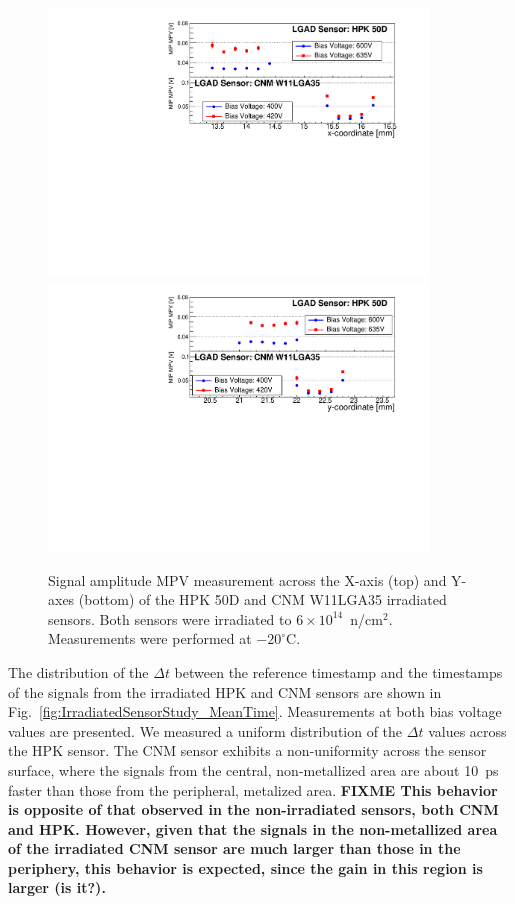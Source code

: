 \documentclass[preprint,1p]{elsarticle}
\begin{document}
\begin{figure}[htbp] 
\centering
\includegraphics[width=0.90\textwidth]{figs/USCSBoard_HPK50DIrradiated-CNMW11LGA35_Run936-961/IrradiatedSensorStudy_MPV_vs_X.pdf} 
\includegraphics[width=0.90\textwidth]{figs/USCSBoard_HPK50DIrradiated-CNMW11LGA35_Run936-961/IrradiatedSensorStudy_MPV_vs_Y.pdf} 
\caption{Signal amplitude MPV measurement across the X-axis (top) and Y-axes (bottom) of the HPK 50D and CNM W11LGA35 irradiated sensors. Both sensors were irradiated to $6\times 10^{14}$~n/cm$^2$. Measurements were performed at $-20^{\circ}$C.} 
\label{fig:IrradiatedSensorStudy_MPV} 
\end{figure}

The distribution of the $\Delta{t}$ between the reference timestamp and the
timestamps of the signals from the irradiated HPK and CNM sensors are shown in
Fig.~\ref{fig:IrradiatedSensorStudy_MeanTime}. Measurements at both bias voltage
values are presented. We measured a uniform distribution of the $\Delta{t}$
values across the HPK sensor. The CNM sensor exhibits a non-uniformity across
the sensor surface, where the signals from the central, non-metallized area
are about 10~ps faster than those from the peripheral, metalized area.
\textbf {FIXME This behavior is opposite of that observed in the non-irradiated
sensors, both CNM and HPK. However, given that the signals in the non-metallized
area of the irradiated CNM sensor are much larger than those in the periphery,
this behavior is expected, since the gain in this region is larger (is it?).}
\end{document}
